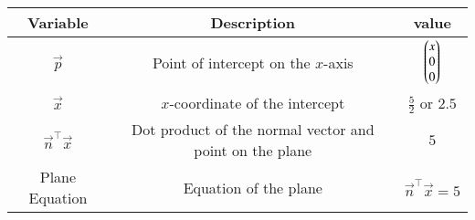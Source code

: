 
    \begin{tabular}{|c|c|c|}
        \hline
        \textbf{Variable}   & \textbf{Description}   &\textbf{value}                  \\
        \hline
        $\Vec{p}$  &  Point of intercept on the $x$-axis &  $ \begin{pmatrix}x \\ 0\\ 0\\\end{pmatrix}$      \\
        \hline
        $\Vec{x}$ & $x$-coordinate of the intercept & $ \frac{5}{2}$  or $2.5 $ \\
        \hline
        $\vec{n}^\top\vec{x}$ &  Dot product of the normal vector and point on the plane & $5$      \\
        \hline
        Plane Equation & Equation of the plane & $\vec{n}^\top\vec{x}=5$ \\
        \hline
    \end{tabular}


